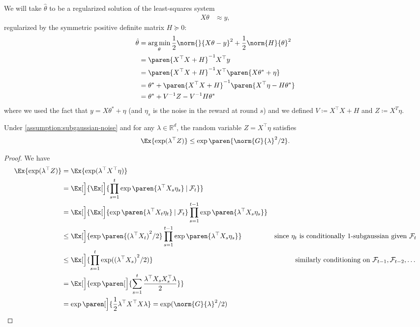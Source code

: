 \documentclass{article}
\newcommand{\defeq}{\coloneq}
\newcommand{\inv}[1]{#1^{-1}}
\newcommand{\Real}{\mathds{R}}
\DeclareMathOperator*{\argmin}{arg\,min}
\newcommand\given[1][\delimsize]{%
  \providecommand{\delimsize}{}
  \nonscript\:#1\vert\allowbreak\nonscript\:\mathopen{}
}
\DeclarePairedDelimiter{\paren}()
\providecommand\transp{\top}
\let\transpsymbol\transp
\renewcommand{\transp}[1]{#1^\transpsymbol}
\begin{document}
We will take $\hat{\theta}$ to be a regularized solution of the
least-squares system
\begin{align*}
  X\theta &\approx y,
\end{align*}
regularized by the symmetric positive definite matrix $H \succeq 0$:
\begin{align*}
  \hat{\theta} &= \argmin_\theta \frac{1}{2}\norm{}{X\theta - y}^2 + \frac{1}{2}\norm{H}{\theta}^2 \\
               &= \inv{\paren{\transp{X}X + H}} \transp{X}y \\
               &= \inv{\paren{\transp{X}X + H}} \transp{X} \paren{X\theta^* + \eta} \\
               &= \theta^* + \inv{\paren{\transp{X}X + H}}\paren{\transp{X}\eta - H\theta^*} \\
               &= \theta^* + \inv{V}Z - \inv{V}H\theta^*
\end{align*}
where we used the fact that $y = X\theta^* + \eta$ (and $\eta_s$ is the
noise in the reward at round $s$) and we defined $V \defeq \transp{X}X
+ H$ and $Z\defeq X^T\eta$.

\begin{lemma}\label{lemma:subgaussian-z}
  Under \cref{assumption:subgaussian-noise} and for any
$\lambda\in\Real^d$, the random variable $Z = \transp{X}\eta$ satisfies
  \begin{align*}
    \Ex{\exp(\transp{\lambda}Z)} \le \exp\paren{\norm{G}{\lambda}^2/2}.
  \end{align*}

  \begin{proof}
    We have
    \begin{align*}
      \Ex{\exp(\transp{\lambda}Z)}
      &= \Ex{\exp(\transp{\lambda}\transp{X}\eta)} \\
      &= \Ex[\Big]{\Ex[\Big]{\prod_{s=1}^t \exp\paren{\transp{\lambda}X_s\eta_s} \given \mathcal{F}_t}} \\
      &= \Ex[\Big]{\Ex[\Big]{\exp\paren{\transp{\lambda}X_t\eta_t} \given \mathcal{F}_t} \prod_{s=1}^{t-1} \exp\paren{\transp{\lambda}X_s\eta_s}} \\
      &\le \Ex[\Big]{\exp\paren{{(\transp{\lambda}X_t)}^2/2}
        \prod_{s=1}^{t-1} \exp\paren{\transp{\lambda}X_s\eta_s}}
      &\text{since $\eta_t$ is conditionally 1-subgaussian given $\mathcal{F}_t$}\\
      &\le \Ex[\Big]{\prod_{s=1}^t\exp({(\transp{\lambda}X_s)}^2/2)}
      &\text{similarly conditioning on $\mathcal{F}_{t-1},\mathcal{F}_{t-2},\dotsc$}\\
      &= \Ex[\Big]{\exp\paren[\Big]{\sum_{s=1}^t\frac{\transp{\lambda}X_s\transp{X_s}\lambda}{2}}} \\
      &= \exp\paren[\Big]{\frac{1}{2}\transp{\lambda}\transp{X}X\lambda}
        = \exp(\norm{G}{\lambda}^2/2)
        \qedhere
    \end{align*}
  \end{proof}
\end{lemma}
\end{document}
